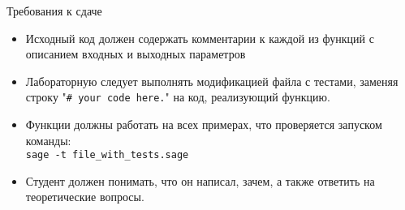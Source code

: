 \documentclass[12pt]{article}
\theoremstyle{definition}
\theoremstyle{definition}
\theoremstyle{definition}
\begin{document}
    Требования к сдаче
    \begin{itemize}
        \item Исходный код должен содержать комментарии к каждой из функций с описанием входных и выходных параметров
        \item Лабораторную следует выполнять модификацией файла с тестами, заменяя строку "\texttt{\# your code here.}" на код, реализующий функцию.
        \item Функции должны работать на всех примерах, что проверяется запуском команды:
        \\\texttt{sage -t file\_with\_tests.sage}
        \item Студент должен понимать, что он написал, зачем, а также ответить на теоретические вопросы.
    \end{itemize}    
    
\end{document}
